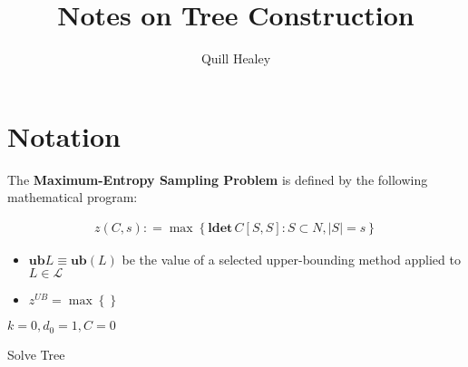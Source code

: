 \documentclass[12pt, reqno]{article}
\title{Notes on Tree Construction}
\author{Quill Healey}
\newcommand{\definedas}{\mathrel{\mathop:}=}
\begin{document}
\maketitle

\section*{Notation}
\noindent The \textbf{Maximum-Entropy Sampling Problem} is defined by the following mathematical program:

\begin{align*}
    z(C, s) \definedas \max \left\{ \textbf{ldet}\, C[S, S] : S \subset N, \left| S \right| = s\right\} 
\end{align*}

\begin{itemize}
    \item $\textbf{ub} L \equiv \textbf{ub}(L)$ be the value of a selected upper-bounding method applied to $L \in \mathcal{L}$
    \item $z^{UB} = \max \left\{  \right\}$
\end{itemize}

\begin{algorithm}[H]
    \SetAlgoLined
        $k=0, d_0 = 1, C = 0$\;
        \caption{Solve Tree}
\end{algorithm}    
\end{document}

